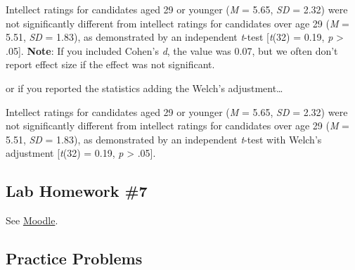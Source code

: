 \documentclass[
]{book}
\begin{document}
Intellect ratings for candidates aged 29 or younger (\emph{M} = 5.65, \emph{SD} = 2.32) were not significantly different from intellect ratings for candidates over age 29 (\emph{M} = 5.51, \emph{SD} = 1.83), as demonstrated by an independent \emph{t}-test {[}\emph{t}(32) = 0.19, \emph{p} \textgreater{} .05{]}.
\textbf{Note}: If you included Cohen's \emph{d}, the value was 0.07, but we often don't report effect size if the effect was not significant.

or if you reported the statistics adding the Welch's adjustment\ldots{}

Intellect ratings for candidates aged 29 or younger (\emph{M} = 5.65, \emph{SD} = 2.32) were not significantly different from intellect ratings for candidates over age 29 (\emph{M} = 5.51, \emph{SD} = 1.83), as demonstrated by an independent \emph{t}-test with Welch's adjustment {[}\emph{t}(32) = 0.19, \emph{p} \textgreater{} .05{]}.

\hypertarget{lab-homework-7-1}{%
\subsection{Lab Homework \#7}\label{lab-homework-7-1}}

See \href{https://moodle.stfx.ca}{Moodle}.

\hypertarget{practice-problems-1}{%
\subsection{Practice Problems}\label{practice-problems-1}}
\end{document}
